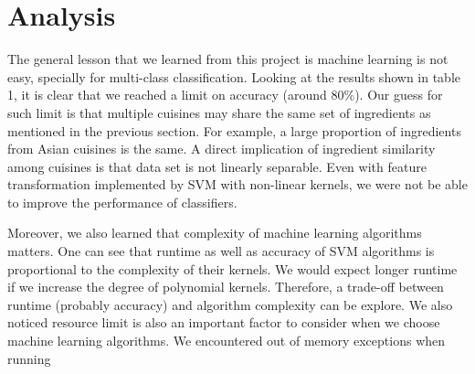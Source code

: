 \section{Analysis}
The general lesson that we learned from this project is machine learning is not easy, specially for multi-class classification. Looking at the results shown in table 1, it is clear that we reached a limit on accuracy (around 80\%). Our guess for such limit is that multiple cuisines may share the same set of ingredients as mentioned in the previous section. For example, a large proportion of ingredients from Asian cuisines is the same. A direct implication of ingredient similarity among cuisines is that data set is not linearly separable. Even with feature transformation implemented by SVM with non-linear kernels, we were not be able to improve the performance of classifiers.

Moreover, we also learned that complexity of machine learning algorithms matters. One can see that runtime as well as accuracy of SVM algorithms is proportional to the complexity of their kernels. We would expect longer runtime if we increase the degree of polynomial kernels. Therefore, a trade-off between runtime (probably accuracy) and algorithm complexity can be explore. We also noticed resource limit is also an important factor to consider when we choose machine learning algorithms. We encountered out of memory exceptions when running 